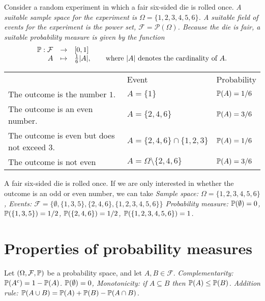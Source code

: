\begin{example}
Consider a random experiment in which a fair six-sided die is rolled once.
\bit
\it A suitable sample space for the experiment is $\Omega=\{1,2,3,4,5,6\}$.
\it A suitable field of events for the experiment is the power set, $\mathcal{F} = \mathcal{P}(\Omega)$.
\it Because the die is fair, a suitable probability measure is given by the function
\[\begin{array}{rcl}
\mathbb{P}:	\mathcal{F} & \to 		& [0,1] \\
		A			& \mapsto 	& \frac{1}{6}|A|, \qquad\text{where $|A|$ denotes the cardinality of $A$.}

\end{array}\] 
\eit

\begin{tabular}{lll}
									& Event	& Probability \\
The outcome is the number $1$.		& $A = \{1\}$ & $\mathbb{P}(A) = 1/6$ \\
The outcome is an even number.		& $A = \{2,4,6\}$  & $\mathbb{P}(A) = 3/6$ \\
The outcome is even but does not exceed $3$.	& $A = \{2,4,6\}\cap\{1,2,3\}$ & $\mathbb{P}(A) = 1/6$ \\
The outcome is not even				& $A = \Omega\setminus\{2,4,6\}$ & $\mathbb{P}(A) = 3/6$ \\
\end{tabular}
\end{example}

\newpage
\break
\begin{example}
A fair six-sided die is rolled once. If we are only interested in whether the outcome is an odd or even number, we can take
\bit
\it Sample space: $\Omega=\{1,2,3,4,5,6\}$,
\it Events: $\mathcal{F} = \big\{\emptyset,\{1,3,5\},\{2,4,6\},\{1,2,3,4,5,6\}\big\}$
\it Probability measure: $\mathbb{P}(\emptyset)=0$, $\mathbb{P}(\{1,3,5\})=1/2$, $\mathbb{P}(\{2,4,6\})=1/2$, $\mathbb{P}(\{1,2,3,4,5,6\})=1$.
\eit
\end{example}

\section{Properties of probability measures}

\begin{theorem}\label{thm:properties_of_probability_measures}
Let $(\Omega,\mathcal{F},\mathbb{P})$ be a probability space, and let $A,B\in\mathcal{F}$. 
\ben
\it Complementarity: $\mathbb{P}(A^c) = 1 - \mathbb{P}(A)$.
\it $\mathbb{P}(\emptyset) = 0$,
\it Monotonicity: if $A\subseteq B$ then $\mathbb{P}(A)\leq \mathbb{P}(B)$.
\it Addition rule: $\mathbb{P}(A\cup B) = \mathbb{P}(A) + \mathbb{P}(B) - \mathbb{P}(A\cap B)$.
\een
\end{theorem}

